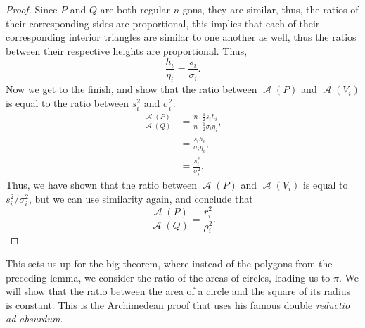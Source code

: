 \documentclass[letterpaper, 12pt]{amsart}
\DeclareMathOperator{\A}{\mathcal{A}}
\theoremstyle{definition}  %
\begin{document}
\begin{proof}
		Since $P$ and $Q$ are both regular $n$-gons, they are similar, thus, the ratios of their corresponding sides are proportional, this implies that each of their corresponding interior triangles are similar to one another as well, thus the ratios between their respective heights are proportional.
		Thus, $$\frac{h_{i}}{\eta_{i}} = \frac{s_{i}}{\sigma_{i}}.$$
		Now we get to the finish, and show that the ratio between $\A(P)$ and $\A(V_{i})$ is equal to the ratio between $s_{i}^{2}$ and $\sigma_{i}^{2}$:
			\begin{align*}
			\frac{\A(P)}{\A(Q)} &= \frac{n \cdot \tfrac{1}{2}s_{i}h_{i}}{n \cdot \tfrac{1}{2}\sigma_{i}\eta_{i}}, \\
			&= \frac{s_{i} h_{i}}{\sigma_{i} \eta_{i}}, \\
			&= \frac{s_{i}^{2}}{\sigma_{i}^{2}}.
			\end{align*}
		Thus, we have shown that the ratio between $\A(P)$ and $\A(V_{i})$ is equal to $s_{i}^{2}/\sigma_{i}^{2}$, but we can use similarity again, and conclude that $$\frac{\A(P)}{\A(Q)} = \frac{r_{i}^{2}}{\rho_{i}^{2}}.$$
		\end{proof}

		This sets us up for the big theorem, where instead of the polygons from the preceding lemma, we consider the ratio of the areas of circles, leading us to $\pi$.
		We will show that the ratio between the area of a circle and the square of its radius is constant.
		This is the Archimedean proof that uses his famous double \textit{reductio ad absurdum}.
\end{document}
